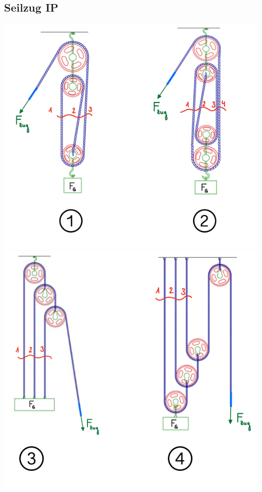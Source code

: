 \subsection{Seilzug \hfill IP}
\begin{footnotesize}
    \begin{center}
        \begin{minipage}{0.58\linewidth}
            \includegraphics[width = 1.0\linewidth]{src/images/MAEIP_Seilzug1}
            \\\includegraphics[width = 0.9\linewidth]{src/images/MAEIP_Seilzug2}

\end{minipage}
\end{center}
\end{footnotesize}
